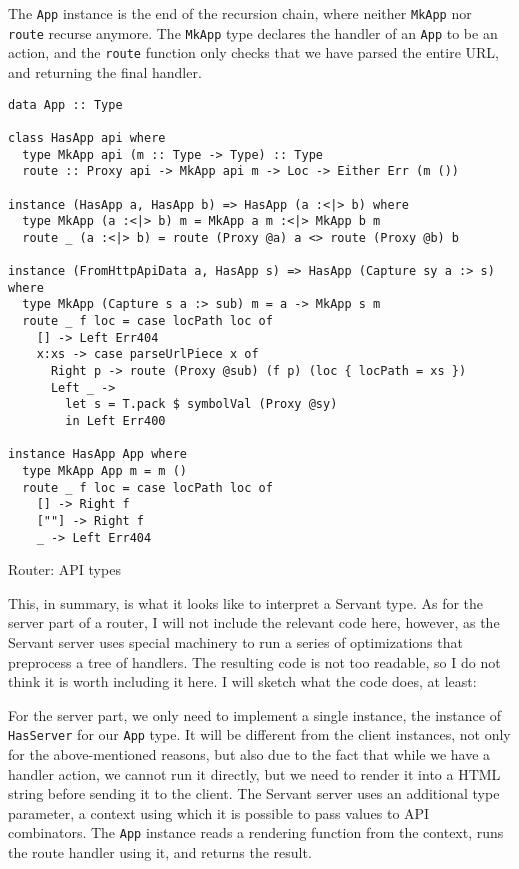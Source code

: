 \documentclass[english,odsaz]{fitthesis}
\begin{document}
The \texttt{App} instance is the end of the recursion chain, where neither \texttt{MkApp} nor
\texttt{route} recurse anymore. The \texttt{MkApp} type declares the handler of an \texttt{App} to be an
action, and the \texttt{route} function only checks that we have parsed the entire URL,
and returning the final handler.

\begin{listing}[htbp]
\begin{verbatim}
data App :: Type

class HasApp api where
  type MkApp api (m :: Type -> Type) :: Type
  route :: Proxy api -> MkApp api m -> Loc -> Either Err (m ())

instance (HasApp a, HasApp b) => HasApp (a :<|> b) where
  type MkApp (a :<|> b) m = MkApp a m :<|> MkApp b m
  route _ (a :<|> b) = route (Proxy @a) a <> route (Proxy @b) b

instance (FromHttpApiData a, HasApp s) => HasApp (Capture sy a :> s) where
  type MkApp (Capture s a :> sub) m = a -> MkApp s m
  route _ f loc = case locPath loc of
    [] -> Left Err404
    x:xs -> case parseUrlPiece x of
      Right p -> route (Proxy @sub) (f p) (loc { locPath = xs })
      Left _ ->
        let s = T.pack $ symbolVal (Proxy @sy)
        in Left Err400

instance HasApp App where
  type MkApp App m = m ()
  route _ f loc = case locPath loc of
    [] -> Right f
    [""] -> Right f
    _ -> Left Err404
\end{verbatim}
\caption{Router: API types \label{router-hasapp}}
\end{listing}

This, in summary, is what it looks like to interpret a Servant type. As for the
server part of a router, I will not include the relevant code here, however, as
the Servant server uses special machinery to run a series of optimizations that
preprocess a tree of handlers. The resulting code is not too readable, so I do
not think it is worth including it here. I will sketch what the code does, at least:

For the server part, we only need to implement a single instance, the instance
of \texttt{HasServer} for our \texttt{App} type. It will be different from the client instances,
not only for the above-mentioned reasons, but also due to the fact that while we
have a handler action, we cannot run it directly, but we need to render it into
a HTML string before sending it to the client. The Servant server uses an
additional type parameter, a context using which it is possible to pass values
to API combinators. The \texttt{App} instance reads a rendering function from the
context, runs the route handler using it, and returns the result.
\end{document}
